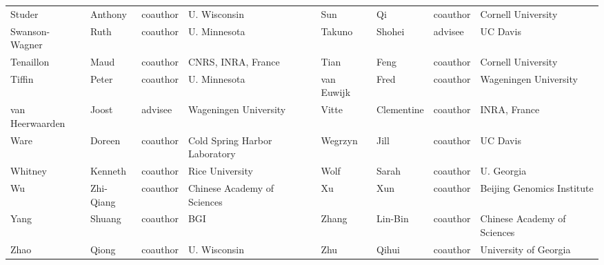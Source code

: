 \documentclass[11pt]{article}
\begin{document}
\begin{tiny}
\begin{tabular}{ l l l l l l l l }
Studer & Anthony & coauthor   & U. Wisconsin &
Sun & Qi & coauthor   & Cornell University \\ 
Swanson-Wagner & Ruth & coauthor   & U. Minnesota &
Takuno & Shohei & advisee & UC Davis \\ 
Tenaillon &  Maud & coauthor   & CNRS, INRA, France & 
Tian & Feng & coauthor   & Cornell University \\ 
Tiffin & Peter & coauthor   & U. Minnesota &
van Euwijk &  Fred & coauthor   & Wageningen University \\
van Heerwaarden &  Joost & advisee & Wageningen University  &
Vitte & Clementine & coauthor   & INRA, France \\
Ware & Doreen & coauthor   & Cold Spring Harbor Laboratory &
Wegrzyn & Jill & coauthor   & UC Davis \\
Whitney &  Kenneth & coauthor   & Rice University &
Wolf & Sarah & coauthor   & U. Georgia \\ 
Wu &  Zhi-Qiang & coauthor   & Chinese Academy of Sciences &
Xu & Xun & coauthor   & Beijing Genomics Institute \\
Yang & Shuang & coauthor   & BGI  &
Zhang &  Lin-Bin & coauthor   & Chinese Academy of Sciences \\
Zhao & Qiong & coauthor   & U. Wisconsin &
Zhu & Qihui & coauthor   & University of Georgia \\
\hline 
\end{tabular}

\end{tiny}
\end{document}
